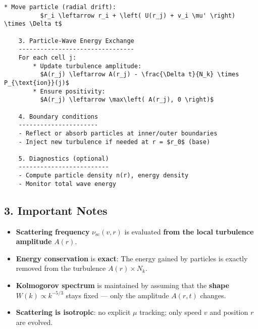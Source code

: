\begin{lstlisting}[language={}, mathescape=true]
        * Move particle (radial drift):
          $r_i \leftarrow r_i + \left( U(r_j) + v_i \mu' \right) \times \Delta t$

    3. Particle-Wave Energy Exchange
    --------------------------------
    For each cell j:
        * Update turbulence amplitude:
          $A(r_j) \leftarrow A(r_j) - \frac{\Delta t}{N_k} \times P_{\text{ion}}(j)$
        * Ensure positivity:
          $A(r_j) \leftarrow \max\left( A(r_j), 0 \right)$

    4. Boundary conditions
    ----------------------
    - Reflect or absorb particles at inner/outer boundaries
    - Inject new turbulence if needed at r = $r_0$ (base)
    
    5. Diagnostics (optional)
    -------------------------
    - Compute particle density n(r), energy density
    - Monitor total wave energy
\end{lstlisting}

\hrulefill

\subsection*{3. \textbf{Important Notes}}

\begin{itemize}
    \item \textbf{Scattering frequency} $\nu_{\text{sc}}(v, r)$ is evaluated \textbf{from the local turbulence amplitude} $A(r)$.
    \item \textbf{Energy conservation} is \textbf{exact}:
    The energy gained by particles is exactly removed from the turbulence $A(r) \times N_k$.
    \item \textbf{Kolmogorov spectrum} is maintained by assuming that the \textbf{shape} $W(k) \propto k^{-5/3}$ stays fixed --- only the amplitude $A(r, t)$ changes.
    \item \textbf{Scattering is isotropic}: no explicit $\mu$ tracking; only speed $v$ and position $r$ are evolved.
\end{itemize}

\hrulefill

